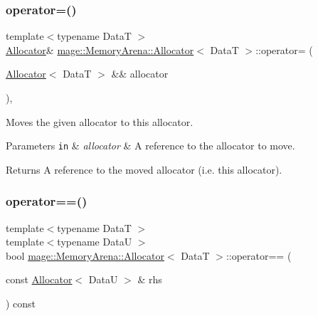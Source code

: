 \subsubsection{\texorpdfstring{operator=()}{operator=()}\hspace{0.1cm}{\footnotesize\ttfamily [2/2]}}
{\footnotesize\ttfamily template$<$typename DataT $>$ \\
\hyperlink{classmage_1_1_memory_arena_1_1_allocator}{Allocator}\& \hyperlink{classmage_1_1_memory_arena_1_1_allocator}{mage\+::\+Memory\+Arena\+::\+Allocator}$<$ DataT $>$\+::operator= (\begin{DoxyParamCaption}\item[{\hyperlink{classmage_1_1_memory_arena_1_1_allocator}{Allocator}$<$ DataT $>$ \&\&}]{allocator }\end{DoxyParamCaption})\hspace{0.3cm}{\ttfamily [default]}, {\ttfamily [noexcept]}}

Moves the given allocator to this allocator.


\begin{DoxyParams}[1]{Parameters}
\mbox{\tt in}  & {\em allocator} & A reference to the allocator to move. \\
\hline
\end{DoxyParams}
\begin{DoxyReturn}{Returns}
A reference to the moved allocator (i.\+e. this allocator). 
\end{DoxyReturn}
\hypertarget{classmage_1_1_memory_arena_1_1_allocator_a7f7971d1bd4522ef847d30d1c5cf3666}{}\label{classmage_1_1_memory_arena_1_1_allocator_a7f7971d1bd4522ef847d30d1c5cf3666} 
\subsubsection{\texorpdfstring{operator==()}{operator==()}}
{\footnotesize\ttfamily template$<$typename DataT $>$ \\
template$<$typename DataU $>$ \\
bool \hyperlink{classmage_1_1_memory_arena_1_1_allocator}{mage\+::\+Memory\+Arena\+::\+Allocator}$<$ DataT $>$\+::operator== (\begin{DoxyParamCaption}\item[{const \hyperlink{classmage_1_1_memory_arena_1_1_allocator}{Allocator}$<$ DataU $>$ \&}]{rhs }\end{DoxyParamCaption}) const\hspace{0.3cm}{\ttfamily [noexcept]}}

